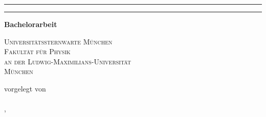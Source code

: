 \begin{titlepage}   

    {\parindent0cm
    \rule{\linewidth}{.4ex}}
  \begin{center}
    {\sffamily \bfseries \Huge \getTitleDE \par}
  \end{center}
    \rule{\linewidth}{.4ex}


  \begin{center}
    {\rmfamily \bfseries \Large Bachelorarbeit}


    {\scshape \large
     Universitätssternwarte München \\
     Fakultät für Physik \\
     an der Ludwig-Maximilians-Universität \\
     München
     
     
     vorgelegt von \\
    
     {\rmfamily \bfseries \Large \getAuthor} \\

     
     \getPrintLocationDE, \getSubmissionDateDE
     }
  \end{center}
  
\end{titlepage}
